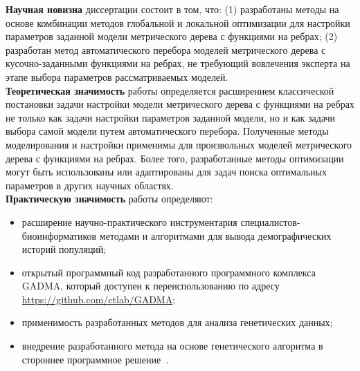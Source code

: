 \textbf{Научная новизна} диссертации состоит в том, что: 
(1) разработаны методы на основе комбинации методов глобальной и локальной оптимизации для настройки параметров заданной модели метрического дерева с функциями на ребрах;
(2) разработан метод автоматического перебора моделей метрического дерева с кусочно-заданными функциями на ребрах, не требующий вовлечения эксперта на этапе выбора параметров рассматриваемых моделей.\\

\textbf{Теоретическая значимость}
работы определяется расширением классической постановки задачи настройки модели метрического дерева с функциями на ребрах не только как задачи настройки параметров заданной модели, но и как задачи выбора самой модели путем автоматического перебора.
Полученные методы моделирования и настройки применимы для произвольных моделей метрического дерева с функциями на ребрах.
Более того, разработанные методы оптимизации могут быть использованы или адаптированы для задач поиска оптимальных параметров в других научных областях.\\

\textbf{Практическую значимость} работы определяют:
\begin{itemize}
    \item расширение научно-практического инструментария специалистов-биоинформатиков методами и алгоритмами для вывода демографических историй популяций;
    \item открытый программный код разработанного программного комплекса GADMA, который доступен к переиспользованию по адресу \url{https://github.com/ctlab/GADMA};
    \item применимость разработанных методов для анализа генетических данных;
    \item внедрение разработанного метода на основе генетического алгоритма в стороннее программное решение~\cite{rippe2021environmental}.\\
\end{itemize}

